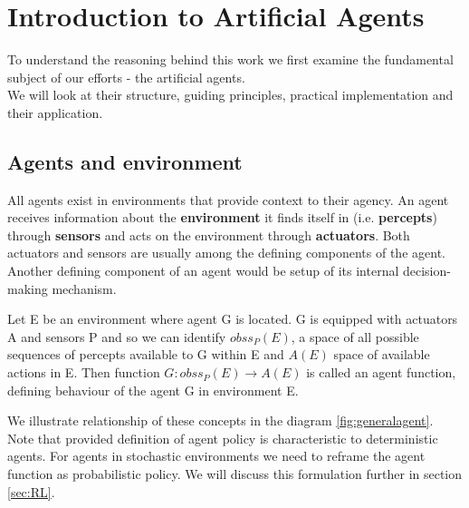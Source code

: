 \chapter{Introduction to Artificial Agents}
\label{ch:agents}
To understand the reasoning behind this work we first examine the fundamental subject of our efforts - the artificial agents.\\
We will look at their structure, guiding principles, practical implementation and their application.
\section{Agents and environment}
All agents exist in environments that provide context to their agency. An agent receives information about the \textbf{environment} it finds itself in (i.e. \textbf{percepts}) through \textbf{sensors} and acts on the environment through \textbf{actuators}. Both actuators and sensors are usually among the defining components of the agent. Another defining component of an agent would be setup of its internal decision-making mechanism.
\begin{defn}
\label{dfn:actuators}
Let E be an environment where agent G is located. G is equipped with actuators A and sensors P and so we can identify $ obss_P(E) $, a space of all possible sequences of percepts available to G within E and $ A(E) $ space of available actions in E.
Then function $ G: obss_P(E)\rightarrow A(E) $ is called an agent function, defining behaviour of the agent G in environment E.
\end{defn}

We illustrate relationship of these concepts in the diagram \ref{fig:generalagent}. Note that provided definition of agent policy is characteristic to deterministic agents. For agents in stochastic environments we need to reframe the agent function as probabilistic policy. We will discuss this formulation further in section \ref{sec:RL}.

 
%
%		
%		
%		
%		
%  



